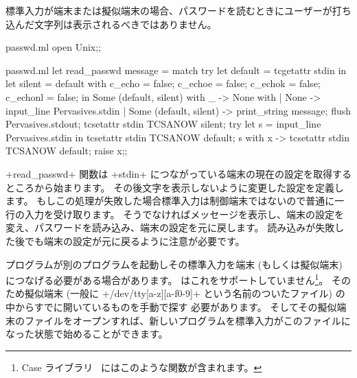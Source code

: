 \begin{example}
標準入力が端末または擬似端末の場合、パスワードを読むときにユーザーが打ち込んだ文字列は表示されるべきではありません。
%
\begin{codefile}{passwd.ml}
open Unix;;
\end{codefile}
%
\begin{listingcodefile}{passwd.ml}
let read_passwd message =
  match
    try
      let default = tcgetattr stdin in
      let silent =
        { default with
          c_echo = false;
          c_echoe = false;
          c_echok = false;
          c_echonl = false;
        } in
      Some (default, silent)
    with _ -> None
  with
  | None -> input_line Pervasives.stdin
  | Some (default, silent) ->
      print_string message;
      flush Pervasives.stdout;
      tcsetattr stdin TCSANOW silent;
      try
        let s = input_line Pervasives.stdin in
        tcsetattr stdin TCSANOW default; s
      with x ->
        tcsetattr stdin TCSANOW default; raise x;;
\end{listingcodefile}
%
\ml+read_passwd+ 関数は \ml+stdin+ につながっている端末の現在の設定を取得するところから始まります。
その後文字を表示しないように変更した設定を定義します。
もしこの処理が失敗した場合標準入力は制御端末ではないので普通に一行の入力を受け取ります。
そうでなければメッセージを表示し、端末の設定を変え、パスワードを読み込み、端末の設定を元に戻します。
読み込みが失敗した後でも端末の設定が元に戻るように注意が必要です。
\end{example}

%
プログラムが別のプログラムを起動しその標準入力を端末 (もしくは擬似端末) につなげる必要がある場合があります。
\ocaml はこれをサポートしていません\footnote{Case ライブラリ~\cite{Cash} にはこのような関数が含まれます。}。
そのため擬似端末 (一般に \ml+/dev/tty[a-z][a-f0-9]+ という名前のついたファイル) の中からすでに開いているものを手動で探す
必要があります。
そしてその擬似端末のファイルをオープンすれば、新しいプログラムを標準入力がこのファイルになった状態で始めることができます。


